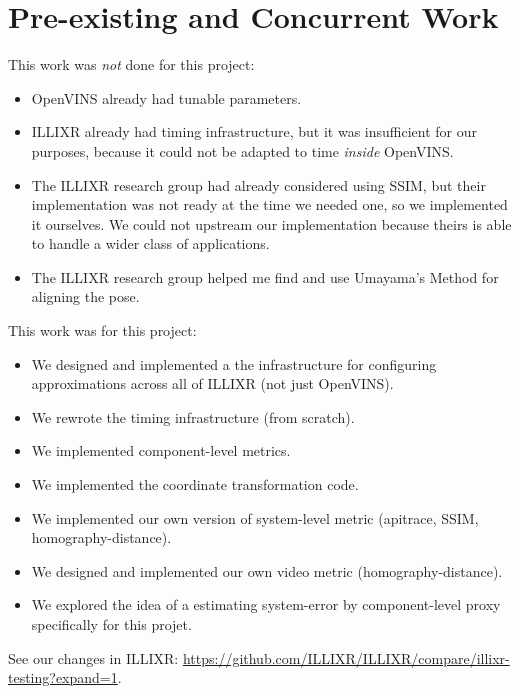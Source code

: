 \documentclass[sigconf,screen]{acmart}
\begin{document}



\appendix
\section{Pre-existing and Concurrent Work}
This work was \textit{not} done for this project:

\begin{itemize}
\item OpenVINS already had tunable parameters.
\item ILLIXR already had timing infrastructure, but it was insufficient for our purposes, because it could not be adapted to time \textit{inside} OpenVINS.
\item The ILLIXR research group had already considered using SSIM, but their implementation was not ready at the time we needed one, so we implemented it ourselves. We could not upstream our implementation because theirs is able to handle a wider class of applications.
\item The ILLIXR research group helped me find and use Umayama's Method for aligning the pose.
\end{itemize}

This work was for this project:

\begin{itemize}
\item We designed and implemented a the infrastructure for configuring approximations across all of ILLIXR (not just OpenVINS).
\item We rewrote the timing infrastructure (from scratch).
\item We implemented component-level metrics.
\item We implemented the coordinate transformation code.
\item We implemented our own version of system-level metric (apitrace, SSIM, homography-distance).
\item We designed and implemented our own video metric (homography-distance).
\item We explored the idea of a estimating system-error by component-level proxy specifically for this projet.
\end{itemize}

See our changes in ILLIXR:
\url{https://github.com/ILLIXR/ILLIXR/compare/illixr-testing?expand=1}.
\end{document}

